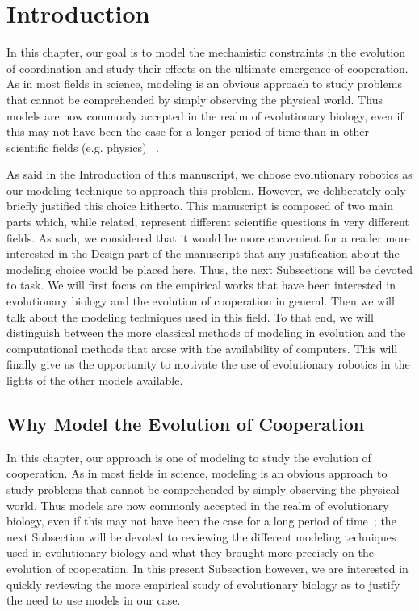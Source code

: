 \section{Introduction}

  In this chapter, our goal is to model the mechanistic constraints in the evolution of coordination and study their effects on the ultimate emergence of cooperation. As in most fields in science, modeling is an obvious approach to study problems that cannot be comprehended by simply observing the physical world. Thus models are now commonly accepted in the realm of evolutionary biology, even if this may not have been the case for a longer period of time than in other scientific fields (e.g. physics) ~\parencite{Shou2015}. 

  As said in the Introduction of this manuscript, we choose evolutionary robotics as our modeling technique to approach this problem. However, we deliberately only briefly justified this choice hitherto. This manuscript is composed of two main parts which, while related, represent different scientific questions in very different fields. As such, we considered that it would be more convenient for a reader more interested in the Design part of the manuscript that any justification about the modeling choice would be placed here. Thus, the next Subsections will be devoted to task. We will first focus on the empirical works that have been interested in evolutionary biology and the evolution of cooperation in general. Then we will talk about the modeling techniques used in this field. To that end, we will distinguish between the more classical methods of modeling in evolution and the computational methods that arose with the availability of computers. This will finally give us the opportunity to motivate the use of evolutionary robotics in the lights of the other models available.


  \subsection{Why Model the Evolution of Cooperation}

    In this chapter, our approach is one of modeling to study the evolution of cooperation. As in most fields in science, modeling is an obvious approach to study problems that cannot be comprehended by simply observing the physical world. Thus models are now commonly accepted in the realm of evolutionary biology, even if this may not have been the case for a long period of time~\parencite{Shou2015}; the next Subsection will be devoted to reviewing the different modeling techniques used in evolutionary biology and what they brought more precisely on the evolution of cooperation. In this present Subsection however, we are interested in quickly reviewing the more empirical study of evolutionary biology as to justify the need to use models in our case. 

